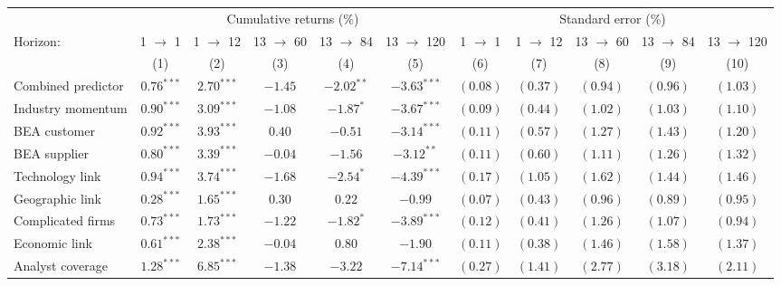 \begin{tabular}{lcccccccccc}
   \toprule & \multicolumn{5}{c}{Cumulative returns (\%)} & \multicolumn{5}{c}{Standard error (\%)} \\
 \cmidrule(l){2-6} \cmidrule(l){7-11}Horizon: & 1 $\rightarrow$ 1 & 1 $\rightarrow$ 12 & 13 $\rightarrow$ 60 & 13 $\rightarrow$ 84 & 13 $\rightarrow$ 120 & 1 $\rightarrow$ 1 & 1 $\rightarrow$ 12 & 13 $\rightarrow$ 60 & 13 $\rightarrow$ 84 & 13 $\rightarrow$ 120 \\ 
   \cmidrule(l){2-6} \cmidrule(l){7-11} \vspace{5pt} & (1) & (2) & (3) & (4) & (5) & (6) & (7) & (8) & (9) & (10) \\ 
   \vspace{5pt}Combined predictor & $0.76^{***}$ & $2.70^{***}$ & $-1.45$ & $-2.02^{**}$ & $-3.63^{***}$ & $(0.08)$ & $(0.37)$ & $(0.94)$ & $(0.96)$ & $(1.03)$ \\ 
  Industry momentum & $0.90^{***}$ & $3.09^{***}$ & $-1.08$ & $-1.87^{*}$ & $-3.67^{***}$ & $(0.09)$ & $(0.44)$ & $(1.02)$ & $(1.03)$ & $(1.10)$ \\ 
  BEA customer & $0.92^{***}$ & $3.93^{***}$ & $0.40$ & $-0.51$ & $-3.14^{***}$ & $(0.11)$ & $(0.57)$ & $(1.27)$ & $(1.43)$ & $(1.20)$ \\ 
  BEA supplier & $0.80^{***}$ & $3.39^{***}$ & $-0.04$ & $-1.56$ & $-3.12^{**}$ & $(0.11)$ & $(0.60)$ & $(1.11)$ & $(1.26)$ & $(1.32)$ \\ 
  Technology link & $0.94^{***}$ & $3.74^{***}$ & $-1.68$ & $-2.54^{*}$ & $-4.39^{***}$ & $(0.17)$ & $(1.05)$ & $(1.62)$ & $(1.44)$ & $(1.46)$ \\ 
  Geographic link & $0.28^{***}$ & $1.65^{***}$ & $0.30$ & $0.22$ & $-0.99$ & $(0.07)$ & $(0.43)$ & $(0.96)$ & $(0.89)$ & $(0.95)$ \\ 
  Complicated firms & $0.73^{***}$ & $1.73^{***}$ & $-1.22$ & $-1.82^{*}$ & $-3.89^{***}$ & $(0.12)$ & $(0.41)$ & $(1.26)$ & $(1.07)$ & $(0.94)$ \\ 
  Economic link & $0.61^{***}$ & $2.38^{***}$ & $-0.04$ & $0.80$ & $-1.90$ & $(0.11)$ & $(0.38)$ & $(1.46)$ & $(1.58)$ & $(1.37)$ \\ 
  Analyst coverage & $1.28^{***}$ & $6.85^{***}$ & $-1.38$ & $-3.22$ & $-7.14^{***}$ & $(0.27)$ & $(1.41)$ & $(2.77)$ & $(3.18)$ & $(2.11)$ \\ 
   \bottomrule 
\end{tabular}
